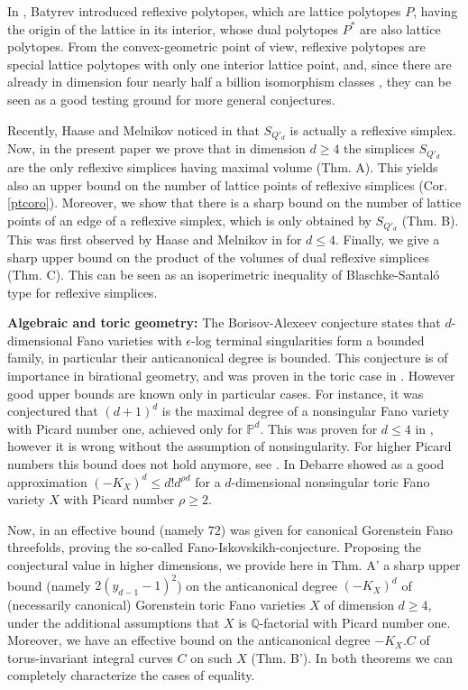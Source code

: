 \documentclass[a4paper,twoside]{article}
\def\P{{\mathbb P}}
\def\Q{{\mathbb Q}}
\begin{document}
In \cite{Bat94}, Batyrev introduced reflexive polytopes, which are lattice polytopes $P$, having the origin of the lattice in its interior, 
whose dual polytopes $P^*$ are also lattice polytopes. 
From the convex-geometric point of view, reflexive polytopes are special lattice polytopes with only one interior lattice point, 
and, since there are already in dimension four nearly half a billion isomorphism classes \cite{KS00}, 
they can be seen as a good testing ground for more general conjectures. 

Recently, Haase and Melnikov noticed in \cite{HM04} that $S_{Q'_d}$ is actually a reflexive simplex. 
Now, in the present paper we prove that in dimension $d \geq 4$ the simplices $S_{Q'_d}$ are the only reflexive 
simplices having maximal volume (Thm. A). This yields also an upper bound on the number of lattice points of reflexive simplices (Cor. \ref{ptcoro}). 
Moreover, we show that there is a sharp bound on the number of lattice points of an edge of a reflexive simplex, which 
is only obtained by $S_{Q'_d}$ (Thm. B). 
This was first observed by Haase and Melnikov in \cite{HM04} for $d \leq 4$. Finally, we give a 
sharp upper bound on the product of the volumes of dual reflexive simplices (Thm. C). This can be seen as 
an isoperimetric inequality of Blaschke-Santal\'o type for reflexive simplices.

\smallskip

\textbf{Algebraic and toric geometry:} The Borisov-Alexeev conjecture states that $d$-dimensional Fano varieties with 
$\epsilon$-log terminal singularities form a bounded family, in particular their anticanonical degree is bounded. 
This conjecture is of importance in birational geometry, and was proven in the toric case in \cite{BB93}. However good upper bounds 
are known only in particular cases. For instance, it was conjectured that $(d+1)^d$ is the maximal degree of a 
nonsingular Fano variety with Picard number one, achieved only for $\P^d$. 
This was proven for $d \leq 4$ in \cite{Hwa03}, however it is wrong without the assumption of nonsingularity. For higher Picard numbers this bound 
does not hold anymore, see \cite{Bat82}. In \cite[Thm.9]{Deb03} Debarre showed as a good approximation 
$(-K_X)^d \leq d! d^{\rho d}$ for a $d$-dimensional nonsingular toric Fano variety $X$ with Picard number $\rho \geq 2$.

Now, in \cite{Pro05} an effective bound (namely $72$) was 
given for canonical Gorenstein Fano threefolds, proving the so-called Fano-Iskovskikh-conjecture. 
Proposing the conjectural value in higher dimensions, 
we provide here in Thm. A' a sharp upper bound (namely $2 (y_{d-1} - 1)^2$) on the anticanonical degree $(-K_X)^d$ of 
(necessarily canonical) Gorenstein toric Fano varieties $X$ of dimension $d \geq 4$, under the additional assumptions 
that $X$ is $\Q$-factorial with Picard number one. Moreover, we have an effective bound on the anticanonical degree $-K_X . C$ 
of torus-invariant integral curves $C$ on such $X$ (Thm. B'). In both theorems we can completely characterize the cases of equality. 
\end{document}
